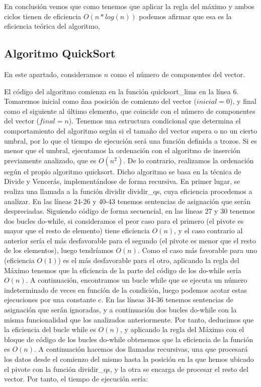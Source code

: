 \documentclass{homework}
\begin{document}
    En conclusión vemos que como tenemos que aplicar la regla del máximo y ambos ciclos tienen de eficiencia $O(n*log(n))$ podemos afirmar que esa es la eficiencia
    teórica del algoritmo, 

    \subsection{Algoritmo QuickSort}
    
     

    En este apartado, consideramos $n$ como el número de componentes del vector. 

    El código del algoritmo comienza en la función quicksort\_lims en la línea 6. Tomaremos inicial 
    como ñaa posición de comienzo del vector ($inicial = 0$), y final como el siguiente al último elemento, 
    que coincide con el número de componentes del vector ($final = n$).
    Tenemos una estructura condicional que determina el comportamiento del algoritmo según si el tamaño del vector 
    supera o no un cierto umbral, por lo que el tiempo de ejecución será una función definida a trozos. Si es menor 
    que el umbral, ejecutamos la ordenación con el algoritmo de inserción previamente analizado, que es $O(n^2)$. De lo
    contrario, realizamos la ordenación según el propio algoritmo quicksort. Dicho algoritmo se basa en la técnica de Divide
    y Vencerás, implementándose de forma recursiva. En primer lugar, se realiza una llamada a la función dividir dividir\_qs, 
    cuya eficiencia procedemos a analizar. En las líneas 24-26 y 40-43 tenemos sentencias de asignación que serán despreciadas. 
    Siguiendo código de forma secuencial, en las líneas 27 y 30 tenemos dos bucles do-while, si consideramos el peor caso para 
    el primero (el pivote es mayor que el resto de elemento) tiene eficiencia $O(n)$, y el caso contrario al anterior sería el 
    más desfavorable para el segundo (el pivote es menor que el resto de los elementos), luego tendríamos $O(n)$. Como el caso más 
    favorable para uno (eficiencia $O(1)$) es el más desfavorable para el otro, aplicando la regla del Máximo tenemos que la 
    eficiencia de la parte del código de los do-while sería $O(n)$.  A continuación, encontramos un bucle while que se ejecuta un 
    número indeterminado de veces en función de la condición, luego podemos acotar estas ejecuciones por una constante c. En las 
    líneas 34-36 tenemos sentencias de asignación que serán ignoradas, y a continuación dos bucles do-while con la misma funcionalidad
    que los analizados anteriormente. Por tanto, deducimos que la eficiencia del bucle while es $O(n)$, y aplicando la regla del 
    Máximo con el bloque de código de los bucles do-while obtenemos que la eficiencia de la función es $O(n)$. A continuación hacemos dos llamadas
    recursivas, una que procesará los datos desde el comienzo del mismo hasta la posición en la que hemos ubicado el pivote con la 
    función dividir\_qs, y la otra se encarga de procesar el resto del vector. Por tanto, el tiempo de ejecución sería:
\end{document}
